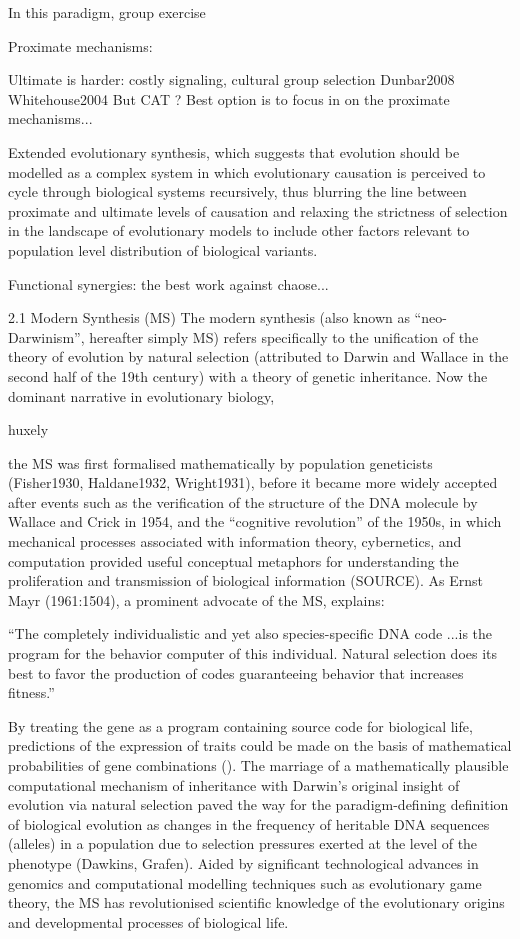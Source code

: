 In this paradigm, group exercise

Proximate mechanisms:

Ultimate is harder:
costly signaling,
cultural group selection
    Dunbar2008
    Whitehouse2004
But CAT ?
Best option is to focus in on the proximate mechanisms...



Extended evolutionary synthesis,
which suggests that evolution should be modelled as a complex system in which evolutionary causation is perceived to cycle through biological systems recursively, thus blurring the line between proximate and ultimate levels of causation and relaxing the strictness of selection in the landscape of evolutionary models to include other factors relevant to population level distribution of biological variants.


Functional synergies: the best work against chaose...



2.1 Modern Synthesis (MS)
  The modern synthesis (also known as ``neo-Darwinism'', hereafter simply MS) refers specifically to the unification of the theory of evolution by natural selection (attributed to Darwin and Wallace in the second half of the 19th century) with a theory of genetic inheritance. Now the dominant narrative in evolutionary biology,

huxely

 the MS was first formalised mathematically by population geneticists (Fisher1930, Haldane1932, Wright1931), before it became more widely accepted after events such as the verification of the structure of the DNA molecule by Wallace and Crick in 1954, and the ``cognitive revolution'' of the 1950s, in which mechanical processes associated with information theory, cybernetics, and computation provided useful conceptual metaphors for understanding the proliferation and transmission of biological information (SOURCE).  As Ernst Mayr (1961:1504), a prominent advocate of the MS, explains:

``The completely individualistic and yet also species-specific DNA code ...is the program for the behavior computer of this individual. Natural selection does its best to favor the production of codes guaranteeing behavior that increases fitness.''

By treating the gene as a program containing source code for biological life, predictions of the expression of traits could be made on the basis of mathematical probabilities of gene combinations (\citep{Dawkins1972;Dawkins1982}). The marriage of a mathematically plausible computational mechanism of inheritance with Darwin's original insight of evolution via natural selection paved the way for the paradigm-defining definition of biological evolution as changes in the frequency of heritable DNA sequences (alleles) in a population due to selection pressures exerted at the level of the phenotype (Dawkins, Grafen). Aided by significant technological advances in genomics and computational modelling techniques such as evolutionary game theory, the MS has revolutionised scientific knowledge of the evolutionary origins and developmental processes of biological life.


